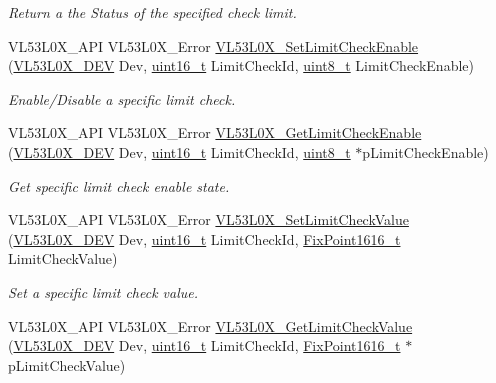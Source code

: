 \begin{DoxyCompactItemize}
\begin{DoxyCompactList}\small\item\em Return a the Status of the specified check limit. \end{DoxyCompactList}\item 
V\+L53\+L0\+X\+\_\+\+A\+PI V\+L53\+L0\+X\+\_\+\+Error \hyperlink{group__VL53L0X__parameters__group_ga356967db0182329895ed339c70ad21af}{V\+L53\+L0\+X\+\_\+\+Set\+Limit\+Check\+Enable} (\hyperlink{group__VL53L0X__platform__group_ga2d6405308b1dd524b462f1b8fb97d167}{V\+L53\+L0\+X\+\_\+\+D\+EV} Dev, \hyperlink{vl53l0x__types_8h_a273cf69d639a59973b6019625df33e30}{uint16\+\_\+t} Limit\+Check\+Id, \hyperlink{vl53l0x__types_8h_aba7bc1797add20fe3efdf37ced1182c5}{uint8\+\_\+t} Limit\+Check\+Enable)
\begin{DoxyCompactList}\small\item\em Enable/\+Disable a specific limit check. \end{DoxyCompactList}\item 
V\+L53\+L0\+X\+\_\+\+A\+PI V\+L53\+L0\+X\+\_\+\+Error \hyperlink{group__VL53L0X__parameters__group_gafc13b35a676124eb56c43dfaf75fb510}{V\+L53\+L0\+X\+\_\+\+Get\+Limit\+Check\+Enable} (\hyperlink{group__VL53L0X__platform__group_ga2d6405308b1dd524b462f1b8fb97d167}{V\+L53\+L0\+X\+\_\+\+D\+EV} Dev, \hyperlink{vl53l0x__types_8h_a273cf69d639a59973b6019625df33e30}{uint16\+\_\+t} Limit\+Check\+Id, \hyperlink{vl53l0x__types_8h_aba7bc1797add20fe3efdf37ced1182c5}{uint8\+\_\+t} $\ast$p\+Limit\+Check\+Enable)
\begin{DoxyCompactList}\small\item\em Get specific limit check enable state. \end{DoxyCompactList}\item 
V\+L53\+L0\+X\+\_\+\+A\+PI V\+L53\+L0\+X\+\_\+\+Error \hyperlink{group__VL53L0X__parameters__group_ga5d311e2420317876030bc6caad01ea90}{V\+L53\+L0\+X\+\_\+\+Set\+Limit\+Check\+Value} (\hyperlink{group__VL53L0X__platform__group_ga2d6405308b1dd524b462f1b8fb97d167}{V\+L53\+L0\+X\+\_\+\+D\+EV} Dev, \hyperlink{vl53l0x__types_8h_a273cf69d639a59973b6019625df33e30}{uint16\+\_\+t} Limit\+Check\+Id, \hyperlink{vl53l0x__types_8h_afb910790161809fc76e1a274a6349384}{Fix\+Point1616\+\_\+t} Limit\+Check\+Value)
\begin{DoxyCompactList}\small\item\em Set a specific limit check value. \end{DoxyCompactList}\item 
V\+L53\+L0\+X\+\_\+\+A\+PI V\+L53\+L0\+X\+\_\+\+Error \hyperlink{group__VL53L0X__parameters__group_ga032fdca6d2bcb68621d4c0ed98d71e1a}{V\+L53\+L0\+X\+\_\+\+Get\+Limit\+Check\+Value} (\hyperlink{group__VL53L0X__platform__group_ga2d6405308b1dd524b462f1b8fb97d167}{V\+L53\+L0\+X\+\_\+\+D\+EV} Dev, \hyperlink{vl53l0x__types_8h_a273cf69d639a59973b6019625df33e30}{uint16\+\_\+t} Limit\+Check\+Id, \hyperlink{vl53l0x__types_8h_afb910790161809fc76e1a274a6349384}{Fix\+Point1616\+\_\+t} $\ast$p\+Limit\+Check\+Value)

\end{DoxyCompactItemize}
